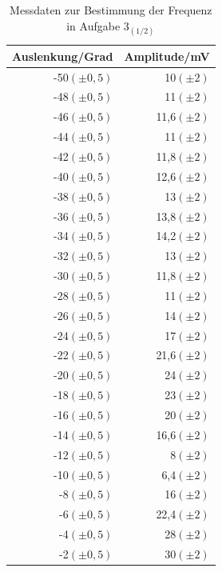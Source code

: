 \documentclass[12pt]{scrartcl}
\begin{document}
\begin{table}[H]
\caption{Messdaten zur Bestimmung der Frequenz in Aufgabe 3$_{(1/2)}$}
\begin{center}
\begin{tabular}{|r|r|}
\hline
Auslenkung/Grad & Amplitude/mV \\ \hline
-50$(\pm 0,5)$ & 10$(\pm 2)$ \\ \hline
-48$(\pm 0,5)$ & 11$(\pm 2)$ \\ \hline
-46$(\pm 0,5)$ & 11,6$(\pm 2)$ \\ \hline
-44$(\pm 0,5)$ & 11$(\pm 2)$ \\ \hline
-42$(\pm 0,5)$ & 11,8$(\pm 2)$ \\ \hline
-40$(\pm 0,5)$ & 12,6$(\pm 2)$ \\ \hline
-38$(\pm 0,5)$ & 13$(\pm 2)$ \\ \hline
-36$(\pm 0,5)$ & 13,8$(\pm 2)$ \\ \hline
-34$(\pm 0,5)$ & 14,2$(\pm 2)$ \\ \hline
-32$(\pm 0,5)$ & 13$(\pm 2)$ \\ \hline
-30$(\pm 0,5)$ & 11,8$(\pm 2)$ \\ \hline
-28$(\pm 0,5)$ & 11$(\pm 2)$ \\ \hline
-26$(\pm 0,5)$ & 14$(\pm 2)$ \\ \hline
-24$(\pm 0,5)$ & 17$(\pm 2)$ \\ \hline
-22$(\pm 0,5)$ & 21,6$(\pm 2)$ \\ \hline
-20$(\pm 0,5)$ & 24$(\pm 2)$ \\ \hline
-18$(\pm 0,5)$ & 23$(\pm 2)$ \\ \hline
-16$(\pm 0,5)$ & 20$(\pm 2)$ \\ \hline
-14$(\pm 0,5)$ & 16,6$(\pm 2)$ \\ \hline
-12$(\pm 0,5)$ & 8$(\pm 2)$ \\ \hline
-10$(\pm 0,5)$ & 6,4$(\pm 2)$ \\ \hline
-8$(\pm 0,5)$ & 16$(\pm 2)$ \\ \hline
-6$(\pm 0,5)$ & 22,4$(\pm 2)$ \\ \hline
-4$(\pm 0,5)$ & 28$(\pm 2)$ \\ \hline
-2$(\pm 0,5)$ & 30$(\pm 2)$ \\ \hline
\end{tabular}
\end{center}
\label{tab:aufgabe3_1}
\end{table}
\end{document}
